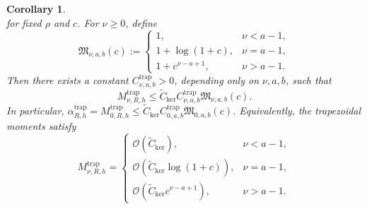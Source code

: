 \documentclass[10pt,reqno]{article}
\numberwithin{equation}{section}
\theoremstyle{plain}
\newtheorem{cor}[thm]{Corollary}
\theoremstyle{definition}
\begin{document}
\begin{cor}
\begin{equation}
\end{equation}
for fixed \(\rho\) and \(c\). For \(\nu\ge0\), define
\begin{equation}\label{eq:trap-sharp-moment-scale}
\mathfrak M_{\nu,a,b}(c) := \begin{cases} 1, & \nu<a-1,\\ 1+\log(1+c), & \nu=a-1,\\ 1+c^{\nu-a+1}, & \nu>a-1. \end{cases}
\end{equation}
Then there exists a constant \(C_{\nu,a,b}^{\operatorname{trap}}>0\), depending only on \(\nu,a,b\), such that
\begin{equation}\label{eq:trap-sharp-moment-bound}
M_{\nu,R,h}^{\operatorname{trap}}\le \widetilde C_{\operatorname{ker}}C_{\nu,a,b}^{\operatorname{trap}}\mathfrak M_{\nu,a,b}(c).
\end{equation}
In particular, \(\alpha_{R,h}^{\operatorname{trap}}=M_{0,R,h}^{\operatorname{trap}}\le \widetilde C_{\operatorname{ker}}C_{0,a,b}^{\operatorname{trap}}\mathfrak M_{0,a,b}(c)\). Equivalently, the trapezoidal moments satisfy
\begin{equation}\label{eq:trap-sharp-moment-asymptotic}
M_{\nu,R,h}^{\operatorname{trap}} = \begin{cases} \mathcal O(\widetilde C_{\operatorname{ker}}), & \nu<a-1,\\ \mathcal O(\widetilde C_{\operatorname{ker}}\log(1+c)), & \nu=a-1,\\ \mathcal O(\widetilde C_{\operatorname{ker}}c^{\nu-a+1}), & \nu>a-1. \end{cases}
\end{equation}
\end{cor}
\end{document}
